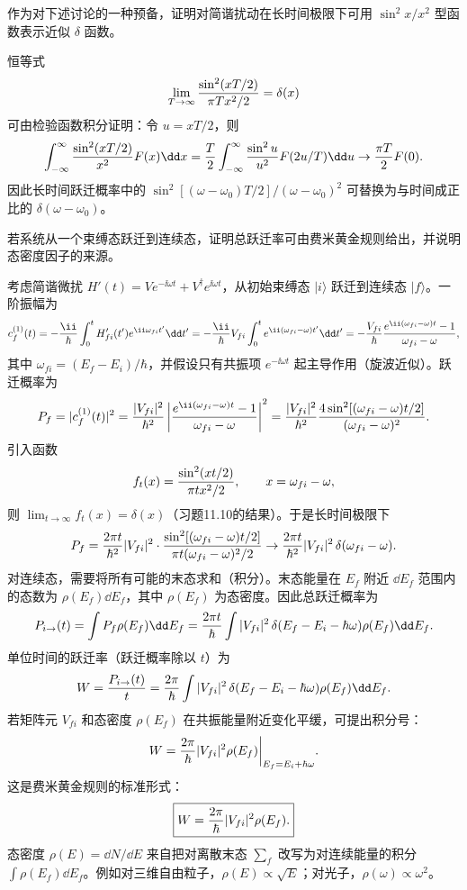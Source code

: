 \begin{question}
作为对下述讨论的一种预备，证明对简谐扰动在长时间极限下可用 $\sin^2 x/x^2$ 型函数表示近似 $\delta$ 函数。
\end{question}
\begin{solution}
恒等式
\[
\lim_{T\to\infty}{\sin^2(xT/2)\over\pi T x^2/2}=\delta(x)
\]
可由检验函数积分证明：令 $u=xT/2$，则
\[
\int_{-\infty}^{\infty}{\sin^2(xT/2)\over x^2}F(x)\dd x
={T\over2}\int_{-\infty}^{\infty}{\sin^2u\over u^2}F(2u/T)\dd u
\to {\pi T\over2}F(0).
\]
因此长时间跃迁概率中的 $\sin^2[(\omega-
\omega_0)T/2]/(
\omega-
\omega_0)^2$ 可替换为与时间成正比的 $\delta(\omega-
\omega_0)$。
\end{solution}

\begin{question}
若系统从一个束缚态跃迁到连续态，证明总跃迁率可由费米黄金规则给出，并说明态密度因子的来源。
\end{question}
\begin{solution}
考虑简谐微扰 $H'(t)=V e^{-\ii\omega t}+V^\dagger e^{\ii\omega t}$，从初始束缚态 $|i\rangle$ 跃迁到连续态 $|f\rangle$。一阶振幅为
\[
c_f^{(1)}(t)=-{\ii\over\hbar}\int_0^t H'_{fi}(t')e^{\ii\omega_{fi}t'}\dd t'
=-{\ii\over\hbar}V_{fi}\int_0^t e^{\ii(\omega_{fi}-\omega)t'}\dd t'
=-{V_{fi}\over\hbar}{e^{\ii(\omega_{fi}-\omega)t}-1\over\omega_{fi}-\omega},
\]
其中 $\omega_{fi}=(E_f-E_i)/\hbar$，并假设只有共振项 $e^{-\ii\omega t}$ 起主导作用（旋波近似）。跃迁概率为
\[
P_f=|c_f^{(1)}(t)|^2={|V_{fi}|^2\over\hbar^2}
\left|{e^{\ii(\omega_{fi}-\omega)t}-1\over\omega_{fi}-\omega}\right|^2
={|V_{fi}|^2\over\hbar^2}
{4\sin^2[(\omega_{fi}-\omega)t/2]\over(\omega_{fi}-\omega)^2}.
\]
引入函数
\[
f_t(x)={\sin^2(xt/2)\over\pi t x^2/2},\qquad x=\omega_{fi}-\omega,
\]
则 $\lim_{t\to\infty}f_t(x)=\delta(x)$（习题11.10的结果）。于是长时间极限下
\[
P_f={2\pi t\over\hbar^2}|V_{fi}|^2\cdot{\sin^2[(\omega_{fi}-\omega)t/2]\over\pi t(\omega_{fi}-\omega)^2/2}
\to{2\pi t\over\hbar^2}|V_{fi}|^2\,\delta(\omega_{fi}-\omega).
\]
对连续态，需要将所有可能的末态求和（积分）。末态能量在 $E_f$ 附近 $\dd E_f$ 范围内的态数为 $\rho(E_f)\dd E_f$，其中 $\rho(E_f)$ 为态密度。因此总跃迁概率为
\[
P_{i\to}(t)=\int P_f\rho(E_f)\dd E_f
={2\pi t\over\hbar}\int|V_{fi}|^2\,\delta(E_f-E_i-\hbar\omega)\rho(E_f)\dd E_f.
\]
单位时间的跃迁率（跃迁概率除以 $t$）为
\[
W={P_{i\to}(t)\over t}
={2\pi\over\hbar}\int|V_{fi}|^2\,\delta(E_f-E_i-\hbar\omega)\rho(E_f)\dd E_f.
\]
若矩阵元 $V_{fi}$ 和态密度 $\rho(E_f)$ 在共振能量附近变化平缓，可提出积分号：
\[
W={2\pi\over\hbar}|V_{fi}|^2\rho(E_f)\bigg|_{E_f=E_i+\hbar\omega}.
\]
这是费米黄金规则的标准形式：
\[
\boxed{W={2\pi\over\hbar}|V_{fi}|^2\rho(E_f).}
\]
态密度 $\rho(E)=\dd N/\dd E$ 来自把对离散末态 $\sum_f$ 改写为对连续能量的积分 $\int\rho(E_f)\dd E_f$。例如对三维自由粒子，$\rho(E)\propto\sqrt{E}$；对光子，$\rho(\omega)\propto\omega^2$。
\end{solution}

